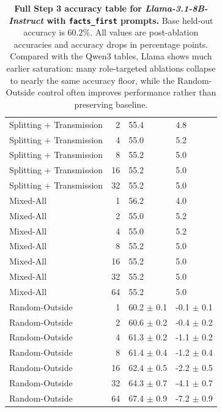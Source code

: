 \documentclass[11pt]{article}
\begin{document}
\begin{table}[p]
{\begin{tabular}{@{} l r l l @{}}
Splitting + Transmission & 2 & 55.4 & 4.8 \\
Splitting + Transmission & 4 & 55.0 & 5.2 \\
Splitting + Transmission & 8 & 55.2 & 5.0 \\
Splitting + Transmission & 16 & 55.2 & 5.0 \\
Splitting + Transmission & 32 & 55.2 & 5.0 \\
Mixed-All & 1 & 56.2 & 4.0 \\
Mixed-All & 2 & 55.0 & 5.2 \\
Mixed-All & 4 & 55.0 & 5.2 \\
Mixed-All & 8 & 55.2 & 5.0 \\
Mixed-All & 16 & 55.2 & 5.0 \\
Mixed-All & 32 & 55.2 & 5.0 \\
Mixed-All & 64 & 55.2 & 5.0 \\
Random-Outside & 1 & 60.2 $\pm$ 0.1 & -0.1 $\pm$ 0.1 \\
Random-Outside & 2 & 60.6 $\pm$ 0.2 & -0.4 $\pm$ 0.2 \\
Random-Outside & 4 & 61.3 $\pm$ 0.2 & -1.1 $\pm$ 0.2 \\
Random-Outside & 8 & 61.4 $\pm$ 0.4 & -1.2 $\pm$ 0.4 \\
Random-Outside & 16 & 62.4 $\pm$ 0.5 & -2.2 $\pm$ 0.5 \\
Random-Outside & 32 & 64.3 $\pm$ 0.7 & -4.1 $\pm$ 0.7 \\
Random-Outside & 64 & 67.4 $\pm$ 0.9 & -7.2 $\pm$ 0.9 \\
\bottomrule
\end{tabular}%
}
\caption{\textbf{Full Step 3 accuracy table for \textit{Llama-3.1-8B-Instruct} with \texttt{facts\_first} prompts.} Base held-out accuracy is $60.2\%$. All values are post-ablation accuracies and accuracy drops in percentage points. Compared with the Qwen3 tables, Llama shows much earlier saturation: many role-targeted ablations collapse to nearly the same accuracy floor, while the Random-Outside control often improves performance rather than preserving baseline.}
\label{tab:llama_ff_full_accuracy}
\end{table}
\end{document}
